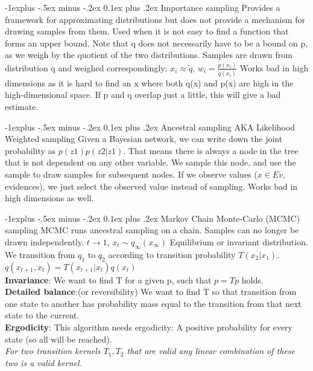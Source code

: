 \documentclass[9pt,landscape]{article}
\makeatletter
\renewcommand{\subsection}{\@startsection{subsection}{2}{0mm}%
                                {-1explus -.5ex minus -.2ex}%
                                {0.1ex plus .2ex}%
                                {\normalfont\scriptsize\bfseries}}
\makeatother
\begin{document}
\begin{multicols}{3}
\subsection{Importance sampling}
Provides a framework for approximating distributions but does not provide a mechanism for drawing samples from them.
Used when it is not easy to find a function that forms an upper bound. Note
that q does not necessarily have to be a bound on p, as we weigh by the quotient of the two distributions. Samples are drawn from distribution q and weighed correspondingly:
$x_i \approx \tilde{q}$, $w_i = \frac{\tilde{p}(x_i)}{\tilde{q}(x_i)}$
Works bad in high dimensions as it is hard to find an x where both q(x) and p(x) are
high in the high-dimensional space. If p and q overlap just a little, this will give a bad
estimate.

\subsection{Ancestral sampling AKA Likelihood Weighted sampling}
Given a Bayesian network, we can write down the joint probability as $p(z1)p(z2|z1)$. That means there is always a node in the tree that is not dependent on any other variable.
We sample this node, and use the sample to draw samples for subsequent nodes. If we observe values ($x \in Ev$, evidences), we just select the observed value instead of
sampling. Works bad in high dimensions as well.

\subsection{Markov Chain Monte-Carlo (MCMC) sampling}
MCMC runs ancestral sampling on a chain. Samples can no longer be drawn independently.
$t \rightarrow 1$, $x_t \sim q_{\infty}(x_{\infty})$ Equilibrium or invariant distribution. We transition from $q_1$ to $q_2$ according to transition probability $T(x_2|x_1)$.\\
$q(x_{t+1}, x_t) = T(x_{t+1}|x_t)q(x_t)$\\
\textbf{Invariance}:
We want to find T for a given p, such that $p = T p$ holds.\\
\textbf{Detailed balance}:(or reversibility) We want to find T so that transition from one state to another has probability mass equal to the transition from that next state to the current.\\
\textbf{Ergodicity}:
This algorithm needs ergodicity: A positive probability for every state (so all will be reached).\\
\textit{For two transition kernels $T_1, T_2$ that are valid any linear combination of these two is a valid kernel.}


\end{multicols}
\end{document}
